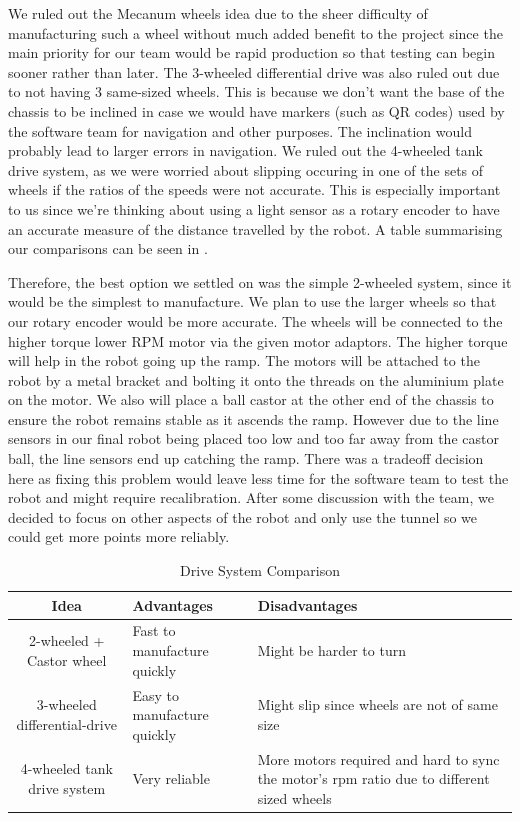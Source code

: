 \documentclass{article}
\begin{document}
\quad We ruled out the Mecanum wheels idea due to the sheer difficulty of manufacturing such a wheel without much added benefit to the project since the main priority for our team would be rapid production so that testing can begin sooner rather than later. The 3-wheeled differential drive was also ruled out due to not having 3 same-sized wheels. This is because we don't want the base of the chassis to be inclined in case we would have markers (such as QR codes) used by the software team for navigation and other purposes. The inclination would probably lead to larger errors in navigation. We ruled out the 4-wheeled tank drive system, as we were worried about slipping occuring in one of the sets of wheels if the ratios of the speeds were not accurate. This is especially important to us since we're thinking about using a light sensor as a rotary encoder to have an accurate measure of the distance travelled by the robot. A table summarising our comparisons can be seen in .

\quad Therefore, the best option we settled on was the simple 2-wheeled system, since it would be the simplest to manufacture. We plan to use the larger wheels so that our rotary encoder would be more accurate. The wheels will be connected to the higher torque lower RPM motor via the given motor adaptors. The higher torque will help in the robot going up the ramp. The motors will be attached to the robot by a metal bracket and bolting it onto the threads on the aluminium plate on the motor. We also will place a ball castor at the other end of the chassis to ensure the robot remains stable as it ascends the ramp. However due to the line sensors in our final robot being placed too low and too far away from the castor ball, the line sensors end up catching the ramp. There was a tradeoff decision here as fixing this problem would leave less time for the software team to test the robot and might require recalibration. After some discussion with the team, we decided to focus on other aspects of the robot and only use the tunnel so we could get more points more reliably.

\begin{table}[]
    \centering
    \begin{tabular}{|c|p{5cm}|p{5cm}|}
        \hline
        Idea & Advantages & Disadvantages \\
        \hline
        2-wheeled + Castor wheel & Fast to manufacture quickly& Might be harder to turn \\
        3-wheeled differential-drive & Easy to manufacture quickly & Might slip since wheels are not of same size \\
        4-wheeled tank drive system & Very reliable & More motors required and hard to sync the motor's rpm ratio due to different sized wheels \\
        \hline
    \end{tabular}
    \caption{Drive System Comparison}
    \label{tab:drive_comp}
\end{table}
\end{document}
